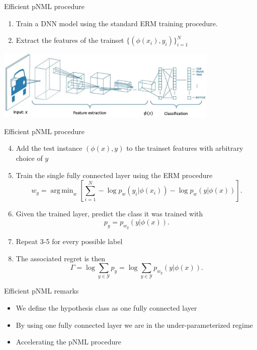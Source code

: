 \documentclass[aspectratio=169]{beamer}
\DeclareMathOperator*{\argmin}{arg\,min}
\begin{document}
\begin{frame}{Efficient pNML procedure}
\begin{enumerate}
\item Train a DNN model using the standard ERM training procedure.
\item  Extract the features of the trainset $ \{(\phi(x_i),y_i)\}_{i=1}^N$
\end{enumerate}
\vspace{1cm}
\centering
\includegraphics[width=0.8\textwidth]{figures/dnn_feature_extraction.pdf}
\end{frame}

\begin{frame}{Efficient pNML procedure}
\begin{enumerate}
\setcounter{enumi}{3}
\item Add the test instance  $(\phi(x),y)$ to the trainset features with arbitrary choice of $y$
\item Train the single fully connected layer using the ERM procedure
    \begin{equation}
    w_{y} = \argmin_{w} \left[\sum_{i=1}^N  - \log p_{w}\left(y_i|\phi(x_i)\right) 
    - \log p_{w}\left(y|\phi(x)\right) \right].
    \end{equation}
\item Given the trained layer, predict the class it was trained with
\begin{equation}
    p_{y} = p_{w_{y}}(y|\phi(x)).
\end{equation}
\item Repeat 3-5 for every possible label
\item The associated regret is then 
    \begin{equation}
    \Gamma = \log \sum_{y \in \mathcal{Y}} p_{y} 
    = \log \sum_{y \in \mathcal{Y}}  p_{w_{y}}(y|\phi(x)). 
    \end{equation}
\end{enumerate}
\end{frame}

\begin{frame}{Efficient pNML remarks}
\vspace{-2.0cm}
\begin{itemize}
\setlength\itemsep{2em}
\item We define the hypothesis class as one fully connected layer
\item By using one fully connected layer we are in the under-parameterized regime
\item Accelerating the pNML procedure
\end{itemize}
\end{frame}
\end{document}
